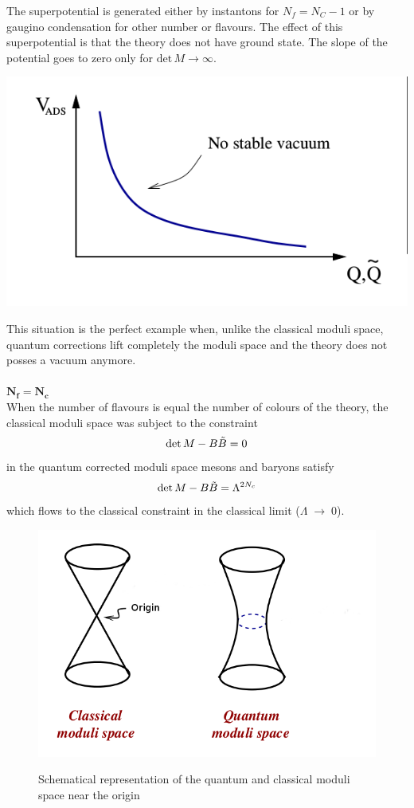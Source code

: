 The superpotential is generated either by instantons for $N_f = N_C -1$ or by gaugino condensation for other number or flavours.
The effect of this superpotential is that the theory does not have ground state.
The slope of the potential goes to zero only for $\mathrm{det} \, {M}  \rightarrow \infty $.
\begin{center}
\includegraphics[scale=0.5]{ads_super.png}
\end{center}
This situation is the perfect example when, unlike the classical moduli space, quantum corrections lift completely the moduli space and the theory does not posses a vacuum anymore.
\\
\\
$\mathbf{ N_f = N_c}$\\
When the number of flavours is equal the number of colours of the theory, the classical moduli space was subject to the constraint
\begin{equation}
 \mathrm{det } \,{M} - B \tilde{B} = 0
\end{equation}
in the quantum corrected moduli space mesons and baryons satisfy \cite{Seiberg:1994bz}
\begin{equation}
 \mathrm{det } \,{M} - B \tilde{B} = \Lambda^{2 N_c}
\end{equation}
which flows to the classical constraint in the classical limit ($\Lambda \; \rightarrow \;0$).

\begin{figure}
\centering
{\includegraphics[width=5 cm]{quantum_moduli_space_sqcd.png} }
{\caption{Schematical representation of the quantum and classical moduli space near the origin}}
\end{figure}


